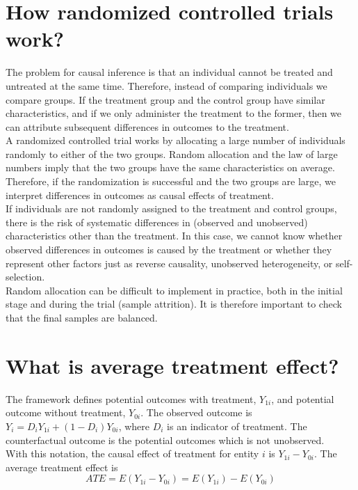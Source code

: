 \documentclass[%
 aip,
 jmp,%
 amsmath,amssymb,
 reprint,%
]{revtex4-1}
\begin{document}
\section*{How randomized controlled trials work?}

The problem for causal inference is that an individual cannot be treated and untreated
at the same time. Therefore, instead of comparing individuals we compare groups. If
the treatment group and the control group have similar characteristics, and if we only
administer the treatment to the former, then we can attribute subsequent differences in
outcomes to the treatment.\\

A randomized controlled trial works by allocating a large number of individuals randomly
to either of the two groups. Random allocation and the law of large numbers imply that
the two groups have the same characteristics on average. Therefore, if the randomization
is successful and the two groups are large, we interpret differences in outcomes as causal
effects of treatment.\\

If individuals are not randomly assigned to the treatment and control groups, there is
the risk of systematic differences in (observed and unobserved) characteristics other than
the treatment. In this case, we cannot know whether observed differences in outcomes is
caused by the treatment or whether they represent other factors just as reverse causality,
unobserved heterogeneity, or self-selection.\\

Random allocation can be difficult to implement in practice, both in the initial stage
and during the trial (sample attrition). It is therefore important to check that the final
samples are balanced.\\

\section*{What is average treatment effect?}

The framework defines potential outcomes with treatment, $Y_{1i}$, and potential outcome
without treatment, $Y_{0i}$. The observed outcome is $Y_i = D_iY_{1i} + (1-D_i)Y_{0i}$, 
where $D_i$ is an indicator of treatment. The counterfactual outcome is the potential
outcomes which is not unobserved.\\

With this notation, the causal effect of treatment for entity $i$ is $Y_{1i} - Y_{0i}$. 
The average treatment effect is $$ATE = E(Y_{1i} - Y_{0i}) = E(Y_{1i}) - E(Y_{0i})$$
\end{document}
